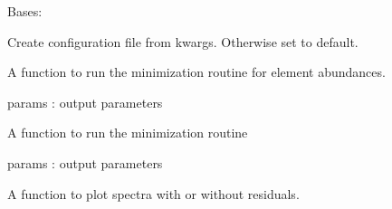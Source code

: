 \documentclass[letterpaper,10pt,english]{sphinxmanual}
\begin{document}
\begin{fulllineitems}
\label{\detokenize{index:FASMA.synthDriver.FASMA}}
Bases: 

\begin{fulllineitems}
\label{\detokenize{index:FASMA.synthDriver.FASMA.configure}}
Create configuration file from kwargs.
Otherwise set to default.

\end{fulllineitems}


\begin{fulllineitems}
\label{\detokenize{index:FASMA.synthDriver.FASMA.minizationElementRunner}}
A function to run the minimization routine for element abundances.

params : output parameters

\end{fulllineitems}


\begin{fulllineitems}
\label{\detokenize{index:FASMA.synthDriver.FASMA.minizationRunner}}
A function to run the minimization routine

params : output parameters

\end{fulllineitems}


\begin{fulllineitems}
\label{\detokenize{index:FASMA.synthDriver.FASMA.plotRunner}}
A function to plot spectra with or without residuals.


\end{fulllineitems}
\end{fulllineitems}
\end{document}
